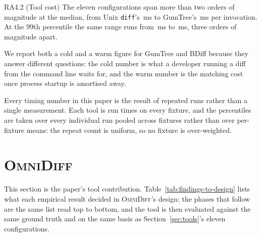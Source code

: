 \documentclass[sigconf]{acmart}
\begin{document}
\begin{resultbox}{RA4.2 (Tool cost)}
The eleven configurations span more than two orders of magnitude at the median, from Unix
\texttt{diff}'s \SpeedUnixDiffPFifty{}\,ms to GumTree's \SpeedGumTreeColdPFifty{}\,ms per
invocation. At the 99th percentile the same range runs from \SpeedUnixDiffPNinetyNine{}\,ms to
\SpeedGumTreeColdPNinetyNine{}\,ms, three orders of magnitude apart.
\end{resultbox}

We report both a cold and a warm figure for GumTree and BDiff because they answer different questions: the cold number is what a developer running a diff from the command line waits for, and the warm number is the matching cost once process startup is amortised away.

Every timing number in this paper is the result of repeated runs rather than a single
measurement. Each tool is run \TimingRepeats{} times on every fixture, and the percentiles are
taken over every individual run pooled across fixtures rather than over per-fixture means: the
repeat count is uniform, so no fixture is over-weighted.



\section{\textsc{OmniDiff}}
\label{sec:omnidiff}

This section is the paper's tool contribution. Table~\ref{tab:findings-to-design} lists what
each empirical result decided in \textsc{OmniDiff}'s design; the phases that follow are the
same list read top to bottom, and the tool is then evaluated against the same ground truth and on
the same basis as Section~\ref{sec:tools}'s eleven configurations.
\end{document}
